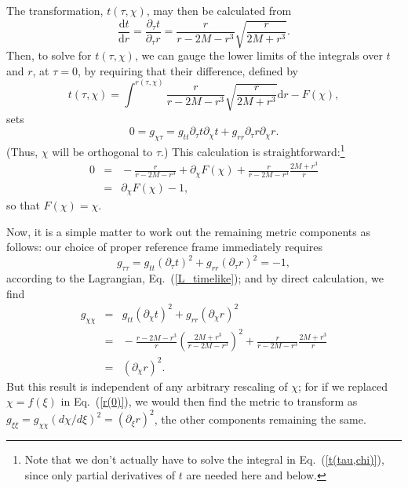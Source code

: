 \documentclass[11pt]{article}
\begin{document}
\begin{appendix}
The transformation, $t(\tau,\chi)$, may then be calculated from
\begin{equation}
\frac{\mathrm{d}t}{\mathrm{d}r}=\frac{\partial_{\tau}t}{\partial_{\tau}r}=\frac{r}{r-2M-r^3}\sqrt{\frac{r}{2M+r^3}}.\label{dtdr}
\end{equation}
Then, to solve for $t(\tau,\chi)$, we can gauge the lower limits of the integrals over $t$ and $r$, at $\tau=0$, by requiring that their difference, defined by 
\begin{equation}
t(\tau,\chi)=\int^{r(\tau,\chi)}\frac{r}{r-2M-r^3}\sqrt{\frac{r}{2M+r^3}}\mathrm{d}r-F(\chi),\label{t(tau,chi)}
\end{equation}
sets 
\begin{equation}
0=g_{\chi\tau}=g_{tt}\partial_{\tau}t\partial_{\chi}t+g_{rr}\partial_{\tau}r\partial_{\chi}r.\label{g_chit}
\end{equation} 
(Thus, $\chi$ will be orthogonal to $\tau$.) This calculation is straightforward:\footnote{Note that we don't actually have to solve the integral in Eq.~(\ref{t(tau,chi)}), since only partial derivatives of $t$ are needed here and below.}
\begin{eqnarray}
0\!\!\!&=&\!\!\!-\frac{r}{r-2M-r^3}+\partial_{\chi}F(\chi)+\frac{r}{r-2M-r^3}\frac{2M+r^3}{r}\\
\!\!\!&=&\!\!\!\partial_{\chi}F(\chi)-1,
\end{eqnarray}
so that $F(\chi)=\chi$.

Now, it is a simple matter to work out the remaining metric components as follows: our choice of proper reference frame immediately requires 
\begin{equation}
g_{\tau\tau}=g_{tt}(\partial_{\tau}t)^2+g_{rr}(\partial_{\tau}r)^2=-1,\label{g_tt}
\end{equation} 
according to the Lagrangian, Eq.~(\ref{L_timelike}); and by direct calculation, we find
\begin{eqnarray}
g_{\chi\chi}\!\!\!&=&\!\!\!g_{tt}(\partial_{\chi}t)^2+g_{rr}(\partial_{\chi}r)^2\\
\!\!\!&=&\!\!\!-\frac{r-2M-r^3}{r}\left(\frac{2M+r^3}{r-2M-r^3}\right)^{2}+\frac{r}{r-2M-r^3}\frac{2M+r^3}{r}\\
\!\!\!&=&\!\!\!(\partial_{\chi}r)^2.\label{g_chichi}
\end{eqnarray} 
But this result is independent of any arbitrary rescaling of $\chi$; for if we replaced $\chi=f(\xi)$ in Eq.~(\ref{r(0)}), we would then find the metric to transform as $g_{\xi\xi}=g_{\chi\chi}(d\chi/d\xi)^2=(\partial_{\xi}r)^2$, the other components remaining the same. 


\end{appendix}
\end{document}
